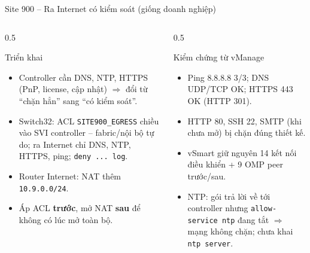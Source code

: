 \documentclass[aspectratio=169, 10pt]{beamer}
\begin{document}
\begin{frame}{Site 900 -- Ra Internet có kiểm soát (giống doanh nghiệp)}
    \begin{columns}[T]
        \begin{column}{0.5\textwidth}
            \begin{exampleblock}{Triển khai}
                \small
                \begin{itemize}
                    \item Controller cần DNS, NTP, HTTPS (PnP, license, cập nhật) $\Rightarrow$ đổi từ ``chặn hẳn'' sang ``có kiểm soát''.
                    \item Switch32: ACL \texttt{SITE900\_EGRESS} chiều vào SVI controller -- fabric/nội bộ tự do;
                          ra Internet chỉ DNS, NTP, HTTPS, ping; \texttt{deny ... log}.
                    \item Router Internet: NAT thêm \texttt{10.9.0.0/24}.
                    \item Áp ACL \textbf{trước}, mở NAT \textbf{sau} để không có lúc mở toàn bộ.
                \end{itemize}
            \end{exampleblock}
        \end{column}
        \begin{column}{0.5\textwidth}
            \begin{block}{Kiểm chứng từ vManage}
                \small
                \begin{itemize}
                    \item Ping 8.8.8.8 3/3; DNS UDP/TCP OK; HTTPS 443 OK (HTTP 301).
                    \item HTTP 80, SSH 22, SMTP (khi chưa mở) bị chặn đúng thiết kế.
                    \item vSmart giữ nguyên 14 kết nối điều khiển + 9 OMP peer trước/sau.
                    \item NTP: gói trả lời về tới controller nhưng \texttt{allow-service ntp} đang tắt
                          $\Rightarrow$ mạng không chặn; chưa khai \texttt{ntp server}.
                \end{itemize}
            \end{block}
        \end{column}
    \end{columns}
\end{frame}
\end{document}

